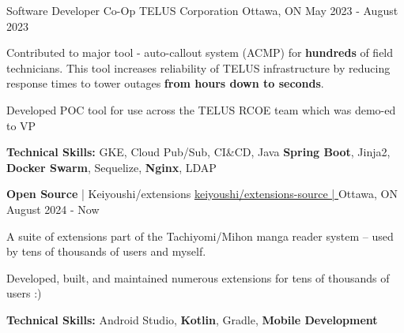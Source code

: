 \begin{cventries}
	\cventry
	{Software Developer Co-Op} %
	{TELUS Corporation} %
	{Ottawa, ON} %
	{May 2023 - August 2023} %
	{
		\begin{cvitems} %
			\item {Contributed to major tool - auto-callout system (ACMP) for \textbf{hundreds} of field technicians. This tool increases reliability of TELUS infrastructure by reducing response times to tower outages \textbf{from hours down to seconds}.}
			\item {Developed POC tool for use across the TELUS RCOE team which was demo-ed to VP}
			\item[] {\textbf{Technical Skills:} GKE, Cloud Pub/Sub, CI\&CD, Java \textbf{Spring Boot}, Jinja2, \textbf{Docker Swarm}, Sequelize, \textbf{Nginx}, LDAP}
		\end{cvitems}
	}

  \cventry
  {\textbf{Open Source} | Keiyoushi/extensions} %
	{\underline{\href{https://github.com/keiyoushi/extensions-source}{keiyoushi/extensions-source | \ExternalLink}}} %
	{Ottawa, ON} %
	{August 2024 - Now} %
	{
		\begin{cvitems} %
      \item {A suite of extensions part of the Tachiyomi/Mihon manga reader system -- used by tens of thousands of users and myself.}
      \item {Developed, built, and maintained numerous extensions for tens of thousands of users :)}
      \item[] {\textbf{Technical Skills:} Android Studio, \textbf{Kotlin}, Gradle, \textbf{Mobile Development}}
		\end{cvitems}
	}


\end{cventries}

